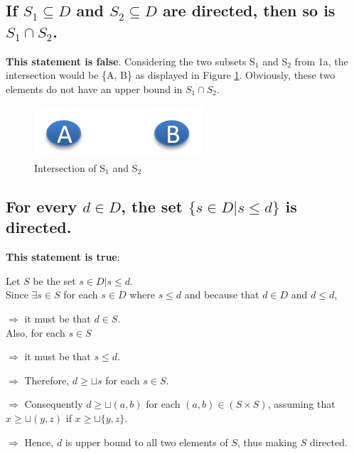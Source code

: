 \subsection{If $S_{1} \subseteq D$ and $S_{2} \subseteq D$ are directed, then so is $S_{1} \cap S_{2}$.}
\textbf{This statement is false}. Considering the two subsets S$_{1}$ and S$_{2}$ from 1a, the intersection would be \{A, B\} as displayed in Figure \ref{img:ex1b:intersection}. Obviously, these two elements do not have an upper bound in $S_{1} \cap S_{2}$.
\begin{figure}[htbp]
  \begin{center}
    \includegraphics{exercises/figures/exercise1b-intersect-S1-S2.png}
    \caption{Intersection of S$_{1}$ and S$_{2}$}
    \label{img:ex1b:intersection}
  \end{center}
\end{figure}

\subsection{For every $d \in D$, the set $\{s \in D | s \leq d\}$ is directed.}
\textbf{This statement is true}:

Let $S$ be the set ${s \in D | s \leq d}$. \\
Since $\exists s \in S$ for each $s \in D$ where $s \leq d$ and because that $d \in D$ and $d \leq d$,

$\Rightarrow$ it must be that $d \in S$. \\
Also, for each $s \in S$

$\Rightarrow$ it must be that $s \leq d$.

$\Rightarrow$ Therefore, $d \geq \sqcup s$ for each $s \in S$.

$\Rightarrow$ Consequently $d \geq \sqcup (a, b)$ for each $(a, b) \in (S \times S)$, assuming that $x \geq \sqcup (y, z)$ if $x \geq \sqcup \{y, z\}$.


$\Rightarrow$ Hence, $d$ is upper bound to all two elements of $S$, thus making $S$ directed.

